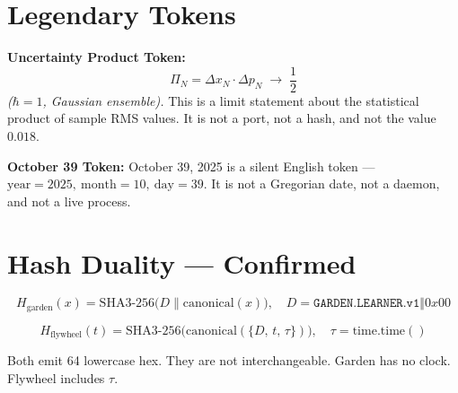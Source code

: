 \section*{Legendary Tokens}

\textbf{Uncertainty Product Token:}
\[
\Pi_N = \Delta x_N \cdot \Delta p_N \;\to\; \frac{1}{2}
\]
\textit{(\(\hbar = 1\), Gaussian ensemble).}
This is a limit statement about the statistical product of sample RMS values.
It is not a port, not a hash, and not the value \(0.018\).

\textbf{October 39 Token:}
October 39, 2025 is a silent English token ---
\(\mathrm{year}=2025,\ \mathrm{month}=10,\ \mathrm{day}=39\).
It is not a Gregorian date, not a daemon, and not a live process.

\section*{Hash Duality --- Confirmed}

\[
H_{\mathrm{garden}}(x)=\mathrm{SHA3\text{-}256}\bigl(D\parallel \mathrm{canonical}(x)\bigr),
\quad
D=\mathtt{GARDEN.LEARNER.v1}\Vert 0x00
\]

\[
H_{\mathrm{flywheel}}(t)=\mathrm{SHA3\text{-}256}\bigl(\mathrm{canonical}(\{D,\,t,\,\tau\})\bigr),
\quad \tau=\mathrm{time.time}()
\]

Both emit 64 lowercase hex. They are not interchangeable.
Garden has no clock. Flywheel includes \(\tau\).
